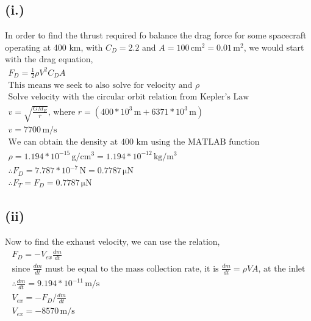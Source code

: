 \documentclass[11pt]{article}
\begin{document}
\subsection*{(i.)}
\hspace*{2em}In order to find the thrust required fo balance
the drag force for some spacecraft operating at 400 km, with $C_D = 2.2$
and $A=100\,\mathrm{cm^2}=0.01\,\mathrm{m^2}$, we would start with the drag equation,
\[
\begin{gathered}
F_D = \frac{1}{2}\rho V^2 C_D A \\
\text{This means we seek to also solve for velocity and $\rho$} \\
\text{Solve velocity with the circular orbit relation from Kepler's Law} \\
v = \sqrt{\frac{GM_E}{r}} \text{, where } r = (400*10^3\,\mathrm{m} + 6371*10^3\,\mathrm{m}) \\
v = 7700\,\mathrm{m/s} \\
\text{We can obtain the density at 400 km using the MATLAB function MSISatmosphere1000,} \\
\rho = 1.194*10^{-15}\,\mathrm{g/cm^3} = 1.194*10^{-12}\,\mathrm{kg/m^3} \\
\therefore F_D = 7.787*10^{-7}\,\mathrm{N} = 0.7787\,\mathrm{\mu N}\\
\boxed{\therefore F_T = F_D = 0.7787\,\mathrm{\mu N}}
\end{gathered}
\]

\subsection*{(ii)}
\hspace*{2em} Now to find the exhaust velocity, we can use the relation,
\[
\begin{gathered}
F_D = -V_{ex}\frac{dm}{dt} \\
\text{since } \frac{dm}{dt} \text{ must be equal to the mass collection rate, it is }
\frac{dm}{dt} = \rho VA \text{, at the inlet} \\
\therefore \frac{dm}{dt} = 9.194*10^{-11}\,\mathrm{m/s} \\
V_{ex} = -F_D/\frac{dm}{dt} \\
\boxed{V_{ex} = -8570\,\mathrm{m/s}}
\end{gathered}
\]

\newpage
\end{document}
